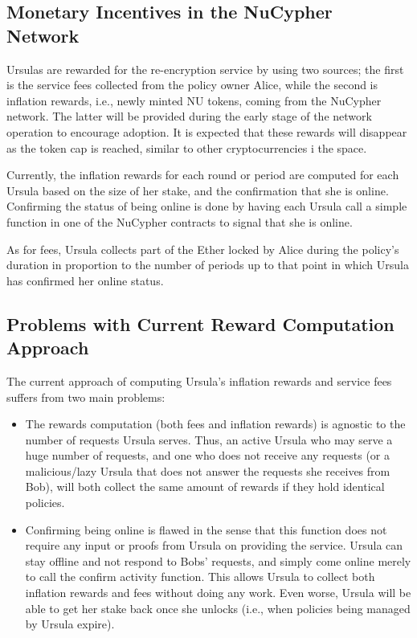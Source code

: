 \subsection{Monetary Incentives in the NuCypher Network}
Ursulas are rewarded for the re-encryption service by using two sources; 
the first is the service fees collected from the policy  
owner Alice, while the second is inflation rewards, i.e., newly minted
NU tokens, coming from the NuCypher network. The latter will be provided during the 
early stage of the network operation to encourage 
adoption. It is expected that these rewards will disappear as the token cap is 
reached, similar to other cryptocurrencies i the space.


Currently, the inflation rewards for each round or period are computed for each Ursula based on the size of her stake, and the confirmation that she is online. Confirming the status of being online is done by having each Ursula call a 
simple function in one of the NuCypher contracts to signal that she is online.

As for fees, Ursula collects part of the Ether locked by Alice during the policy's duration in proportion to the number of periods up to that point in which Ursula has confirmed her online status. 


\subsection{Problems with Current Reward Computation Approach}
The current approach of computing Ursula's inflation rewards and service fees suffers from two
main problems:
\begin{itemize}
\setlength{\itemsep}{0pt}
\item The rewards computation (both fees and inflation rewards) is agnostic to the number of 
requests Ursula serves. Thus, an active Ursula who may serve a huge number of 
requests, and one who does not receive any requests (or a
malicious/lazy Ursula that does not answer the requests she receives from Bob), will 
both collect the same amount of rewards if they hold identical policies.

\item Confirming being online is flawed in the sense that this function does 
not require any input or proofs from Ursula on providing the service. Ursula 
can stay offline and not respond to Bobs' requests, and simply come online merely to call the confirm activity
function. This allows Ursula to collect both inflation rewards 
and fees without doing any work. Even worse, Ursula will be able to get her stake back once she unlocks (i.e., when policies being managed by Ursula expire). 
\end{itemize}



